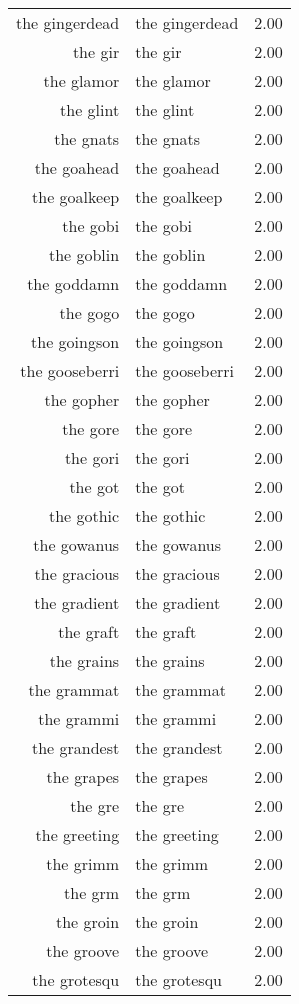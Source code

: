 \begin{table}[ht]
\begin{tabular}{rlr}
  the gingerdead & the gingerdead & 2.00 \\ 
  the gir & the gir & 2.00 \\ 
  the glamor & the glamor & 2.00 \\ 
  the glint & the glint & 2.00 \\ 
  the gnats & the gnats & 2.00 \\ 
  the goahead & the goahead & 2.00 \\ 
  the goalkeep & the goalkeep & 2.00 \\ 
  the gobi & the gobi & 2.00 \\ 
  the goblin & the goblin & 2.00 \\ 
  the goddamn & the goddamn & 2.00 \\ 
  the gogo & the gogo & 2.00 \\ 
  the goingson & the goingson & 2.00 \\ 
  the gooseberri & the gooseberri & 2.00 \\ 
  the gopher & the gopher & 2.00 \\ 
  the gore & the gore & 2.00 \\ 
  the gori & the gori & 2.00 \\ 
  the got & the got & 2.00 \\ 
  the gothic & the gothic & 2.00 \\ 
  the gowanus & the gowanus & 2.00 \\ 
  the gracious & the gracious & 2.00 \\ 
  the gradient & the gradient & 2.00 \\ 
  the graft & the graft & 2.00 \\ 
  the grains & the grains & 2.00 \\ 
  the grammat & the grammat & 2.00 \\ 
  the grammi & the grammi & 2.00 \\ 
  the grandest & the grandest & 2.00 \\ 
  the grapes & the grapes & 2.00 \\ 
  the gre & the gre & 2.00 \\ 
  the greeting & the greeting & 2.00 \\ 
  the grimm & the grimm & 2.00 \\ 
  the grm & the grm & 2.00 \\ 
  the groin & the groin & 2.00 \\ 
  the groove & the groove & 2.00 \\ 
  the grotesqu & the grotesqu & 2.00 \\ 

\end{tabular}
\end{table}
